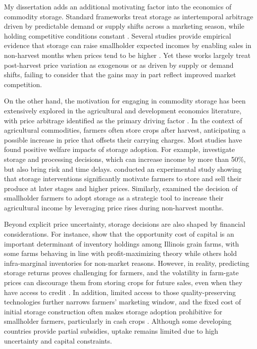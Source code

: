 My dissertation adds an additional motivating factor into the economics of commodity storage. Standard frameworks treat storage as intertemporal arbitrage driven by predictable demand or supply shifts across a marketing season, while holding competitive conditions constant \citep{helmberger1977welfare, wright1982econ, wright1984welfare, deaton1992behaviour}. Several studies provide empirical evidence that storage can raise smallholder expected incomes by enabling sales in non-harvest months when prices tend to be higher \citep{aggarwal2018grain, priya2020post, ruhinduka2020smallholder}. Yet these works largely treat post-harvest price variation as exogenous or as driven by supply or demand shifts, failing to consider that the gains may in part reflect improved market competition.


On the other hand, the motivation for engaging in commodity storage has been extensively explored in the agricultural and development economics literature, with price arbitrage identified as the primary driving factor \citep{helmberger1977welfare, wright1984welfare, deaton1992behaviour, miranda1996, wright1982econ, minten2014new, nindi2024incentive}. In the context of agricultural commodities, farmers often store crops after harvest, anticipating a possible increase in price that offsets their carrying charges. Most studies have found positive welfare impacts of storage adoption. For example, \cite{ruhinduka2020smallholder} investigate storage and processing decisions, which can increase income by more than 50\%, but also bring risk and time delays. \cite{aggarwal2018grain} conducted an experimental study showing that storage interventions significantly motivate farmers to store and sell their produce at later stages and higher prices. Similarly, \cite{priya2020post} examined the decision of smallholder farmers to adopt storage as a strategic tool to increase their agricultural income by leveraging price rises during non-harvest months.

Beyond explicit price uncertainty, storage decisions are also shaped by financial considerations. For instance, \cite{janzen2024commodity} show that the opportunity cost of capital is an important determinant of inventory holdings among Illinois grain farms, with some farms behaving in line with profit-maximizing theory while others hold infra-marginal inventories for non-market reasons. However, in reality, predicting storage returns proves challenging for farmers, and the volatility in farm-gate prices can discourage them from storing crops for future sales, even when they have access to credit \citep{cardell2023price}. In addition, limited access to those quality-preserving technologies further narrows farmers' marketing window, and the fixed cost of initial storage construction often makes storage adoption prohibitive for smallholder farmers, particularly in cash crops \citep{aggarwal2018grain}. Although some developing countries provide partial subsidies, uptake remains limited due to high uncertainty and capital constraints.

